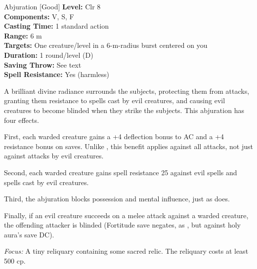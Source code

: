 {Abjuration [Good]}
{
	\textbf{Level:}
	Clr 8\\
	\textbf{Components:}
	V, S, F\\
	\textbf{Casting Time:}
	1 standard action\\
	\textbf{Range:}
	6 m\\
	\textbf{Targets:}
	One creature/level in a 6-m-radius burst centered on you\\
	\textbf{Duration:}
	1 round/level (D)\\
	\textbf{Saving Throw:}
	See text\\
	\textbf{Spell Resistance:}
	Yes (harmless)\\
}
{
	A brilliant divine radiance surrounds the subjects, protecting them from attacks, granting them resistance to spells cast by evil creatures, and causing evil creatures to become blinded when they strike the subjects. This abjuration has four effects.

	First, each warded creature gains a +4 deflection bonus to AC and a +4 resistance bonus on saves. Unlike , this benefit applies against all attacks, not just against attacks by evil creatures.

	Second, each warded creature gains spell resistance 25 against evil spells and spells cast by evil creatures.

	Third, the abjuration blocks possession and mental influence, just as  does.

	Finally, if an evil creature succeeds on a melee attack against a warded creature, the offending attacker is blinded (Fortitude save negates, as , but against holy aura's save DC).

	\textit{Focus:}
	A tiny reliquary containing some sacred relic. The reliquary costs at least 500 cp.

}
